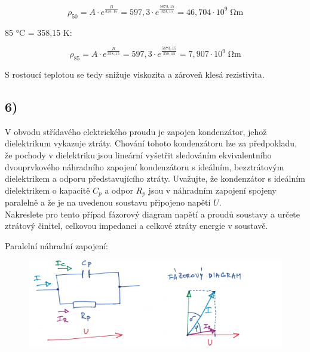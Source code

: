 \begin{equation*}
    \rho_{50} = A \cdot e^\frac{B}{323,15} = 597,3 \cdot e^\frac{5873,15}{323,15} = 46,704\cdot 10^9 \; \si{\ohm\meter}
\end{equation*}

85 \si{\celsius} = 358,15 \si{\kelvin}:

\begin{equation*}
    \rho_{85} = A \cdot e^\frac{B}{358,15} =  597,3 \cdot e^\frac{5873,15}{358,15} = 7,907 \cdot 10^9 \; \si{\ohm\meter}
\end{equation*}

S rostoucí teplotou se tedy snižuje viskozita a zároveň klesá rezistivita.

\newpage


\subsection*{6)}
V obvodu střídavého elektrického proudu je zapojen kondenzátor, jehož dielektrikum vykazuje ztráty. Chování tohoto kondenzátoru lze za předpokladu, že pochody v dielektriku jsou lineární vyšetřit sledováním ekvivalentního dvouprvkového náhradního zapojení kondenzátoru s ideálním, bezztrátovým dielektrikem a odporu představujícího ztráty. Uvažujte, že kondenzátor s ideálním dielektrikem o kapacitě $C_p$ a odpor $R_p$ jsou v náhradním zapojení spojeny paralelně a že je na uvedenou soustavu připojeno napětí $U$. \\
Nakreslete pro tento případ fázorový diagram napětí a proudů soustavy a určete ztrátový činitel, celkovou impedanci a celkové ztráty energie v soustavě.

%
%

Paralelní náhradní zapojení:
\begin{figure}[h]
    \centering
    \includegraphics[width=.7\textwidth]{images/ul6_sch.jpg}
\end{figure}


